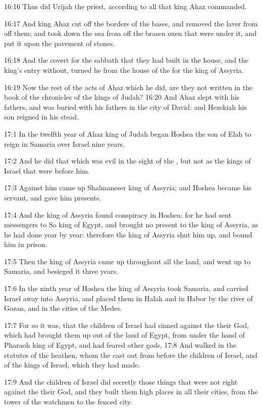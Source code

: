 16:16 Thus did Urijah the priest, according to all that king Ahaz commanded.

16:17 And king Ahaz cut off the borders of the bases, and removed the laver from off them; and took down the sea from off the brasen oxen that were under it, and put it upon the pavement of stones.

16:18 And the covert for the sabbath that they had built in the house, and the king's entry without, turned he from the house of the \LORD for the king of Assyria.

16:19 Now the rest of the acts of Ahaz which he did, are they not written in the book of the chronicles of the kings of Judah?  16:20 And Ahaz slept with his fathers, and was buried with his fathers in the city of David: and Hezekiah his son reigned in his stead.

17:1 In the twelfth year of Ahaz king of Judah began Hoshea the son of Elah to reign in Samaria over Israel nine years.

17:2 And he did that which was evil in the sight of the \LORD, but not as the kings of Israel that were before him.

17:3 Against him came up Shalmaneser king of Assyria; and Hoshea became his servant, and gave him presents.

17:4 And the king of Assyria found conspiracy in Hoshea: for he had sent messengers to So king of Egypt, and brought no present to the king of Assyria, as he had done year by year: therefore the king of Assyria shut him up, and bound him in prison.

17:5 Then the king of Assyria came up throughout all the land, and went up to Samaria, and besieged it three years.

17:6 In the ninth year of Hoshea the king of Assyria took Samaria, and carried Israel away into Assyria, and placed them in Halah and in Habor by the river of Gozan, and in the cities of the Medes.

17:7 For so it was, that the children of Israel had sinned against the \LORD their God, which had brought them up out of the land of Egypt, from under the hand of Pharaoh king of Egypt, and had feared other gods, 17:8 And walked in the statutes of the heathen, whom the \LORD cast out from before the children of Israel, and of the kings of Israel, which they had made.

17:9 And the children of Israel did secretly those things that were not right against the \LORD their God, and they built them high places in all their cities, from the tower of the watchmen to the fenced city.

